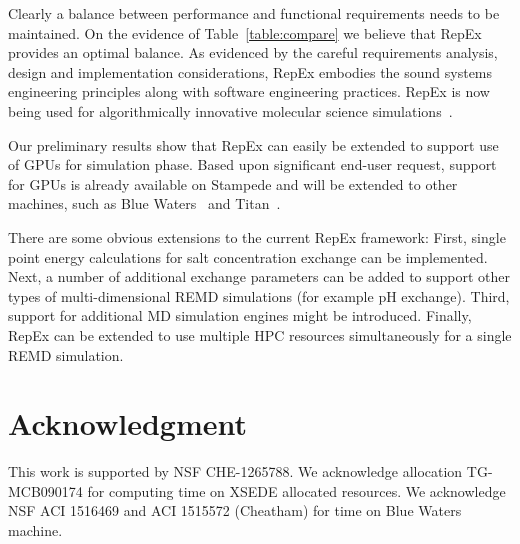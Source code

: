 \documentclass{sig-alternate-05-2015}
\begin{document}
Clearly a balance between performance and functional requirements needs to be maintained.  On the evidence of Table~\ref{table:compare} we believe that RepEx provides an optimal balance.  As evidenced by the careful requirements analysis, design and implementation considerations, RepEx embodies the sound systems engineering principles along with software engineering practices.  RepEx is now being used for algorithmically innovative molecular science simulations~\cite{ct500776j}.
    
Our preliminary results show that RepEx can easily be extended to support use of GPUs for simulation phase. Based upon significant end-user request, support for GPUs is already available on Stampede and will be extended to other machines, such as Blue Waters~\cite{blue.waters} and Titan~\cite{titan}.

There are some obvious extensions to the current RepEx framework: First, single point energy calculations for salt concentration exchange can be implemented. Next, a number of additional exchange parameters can be added to support other types of multi-dimensional REMD simulations (for example pH exchange). Third, support for additional MD simulation engines might be introduced. Finally, RepEx can be extended to use multiple HPC resources simultaneously for a single REMD simulation.



\section*{Acknowledgment}

This work is supported by NSF CHE-1265788. We acknowledge allocation TG-MCB090174 for computing time on XSEDE allocated resources. We acknowledge NSF ACI 1516469 and ACI 1515572 (Cheatham) for time on Blue Waters machine.


\end{document}
